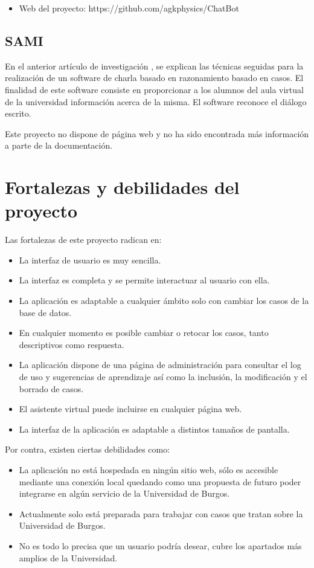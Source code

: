 \begin{itemize}
\tightlist
\item
Web del proyecto: https://github.com/agkphysics/ChatBot
\end{itemize}

\subsection{SAMI}

En el anterior artículo de investigación \cite{SAMI:project}, se explican las técnicas seguidas para la realización de un software de charla basado en razonamiento basado en casos. El finalidad de este software consiste en proporcionar a los alumnos del aula virtual de la universidad información acerca de la misma. El software reconoce el diálogo escrito.

Este proyecto no dispone de página web y no ha sido encontrada más información a parte de la documentación.

\section{Fortalezas y debilidades del proyecto}

Las fortalezas de este proyecto radican en:

\begin{itemize}
\tightlist
\item
La interfaz de usuario es muy sencilla.
\item
La interfaz es completa y se permite interactuar al usuario con ella.
\item
La aplicación es adaptable a cualquier ámbito solo con cambiar los casos de la base de datos.
\item
En cualquier momento es posible cambiar o retocar los casos, tanto descriptivos como respuesta.
\item
La aplicación dispone de una página de administración para consultar el log de uso y sugerencias de aprendizaje así como la inclusión, la modificación y el borrado de casos.
\item
El asistente virtual puede incluirse en cualquier página web.
\item
La interfaz de la aplicación es adaptable a distintos tamaños de pantalla.
\end{itemize}

Por contra, existen ciertas debilidades como:

\begin{itemize}
\tightlist
\item
La aplicación no está hospedada en ningún sitio web, sólo es accesible mediante una conexión local quedando como una propuesta de futuro poder integrarse en algún servicio de la Universidad de Burgos.
\item
Actualmente solo está preparada para trabajar con casos que tratan sobre la Universidad de Burgos.
\item
No es todo lo precisa que un usuario podría desear, cubre los apartados más amplios de la Universidad.
\end{itemize}

